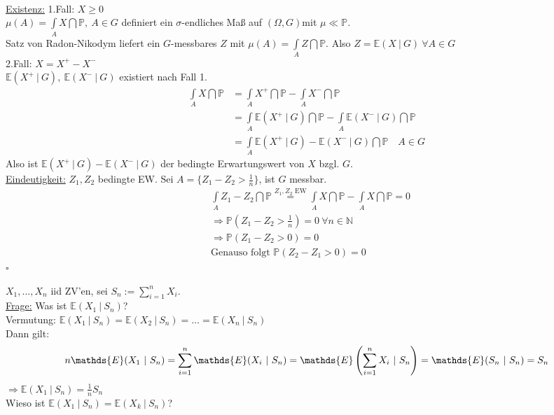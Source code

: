 \\
\uline{Existenz:} 1.Fall: $X\ge 0$\\
$\mu(A)=\int\limits_AX\dint\mathds{P},~A\in G$ definiert ein $\sigma$-endliches Maß auf $(\Omega,G)$mit $\mu \ll \mathds{P}$.\\
Satz von Radon-Nikodym liefert ein $G$-messbares $Z$ mit $\mu(A)=\int\limits_A Z\dint\mathds{P}$. Also $Z=\mathds{E}(X~|~G)~\forall A\in G$\\
2.Fall: $X=X^+-X^-$\\
$\mathds{E}(X^+~|~G),~\mathds{E}(X^-~|~G)$ existiert nach Fall 1.
\begin{equation*}
\begin{aligned}
	\int\limits_AX\dint\mathds{P} &= \int\limits_AX^+\dint\mathds{P}-\int\limits_AX^-\dint\mathds{P}\\
	&= \int\limits_A\mathds{E}(X^+~|~G)\dint\mathds{P}-\int\limits_A\mathds{E}(X^-~|~G)\dint\mathds{P}\\
	&= \int\limits_A\mathds{E}(X^+~|~G)-\mathds{E}(X^-~|~G)\dint\mathds{P}\quad A\in G
\end{aligned}
\end{equation*}
Also ist $\mathds{E}(X^+~|~G)-\mathds{E}(X^-~|~G)$ der bedingte Erwartungswert von $X$ bzgl. $G$.\\
\uline{Eindeutigkeit:} $Z_1,Z_2$ bedingte EW. Sei $A=\{Z_1-Z_2>\frac{1}{n}\}$, ist $G$ messbar.
\begin{equation*}
\begin{aligned}
	&\int\limits_{A}Z_1-Z_2\dint\mathds{P}\stackrel{Z_1,Z_2\text{ EW}}{=} \int\limits_AX\dint\mathds{P}-\int\limits_AX\dint\mathds{P}=0\\
	&\Rightarrow \mathds{P}(Z_1-Z_2>\frac{1}{n})=0~\forall n\in \mathds{N}\\
	&\Rightarrow \mathds{P}(Z_1-Z_2>0)=0\\
	&\text{Genauso folgt } \mathds{P}(Z_2-Z_1>0)=0
\end{aligned}
\end{equation*}
\hfill $\square$

$X_1,\dots,X_n $ iid ZV'en, sei $S_n:=\sum_{i=1}^{n}X_i$.\\
\uline{Frage:} Was ist $\mathds{E}(X_1~|~S_n)$?\\
Vermutung: $\mathds{E}(X_1~|~S_n)=\mathds{E}(X_2~|~S_n)=\dots=\mathds{E}(X_n~|~S_n)$\\
Dann gilt: 
\[
n\mathds{E}(X_1~|~S_n)=\sum_{i=1}^{n}\mathds{E}(X_i~|~S_n)=\mathds{E}\enbrace{\sum_{i=1}^{n}X_i~|~S_n}=\mathds{E}(S_n~|~S_n)=S_n
\]
$\Rightarrow \mathds{E}(X_1~|~S_n)=\frac{1}{n}S_n$\\
Wieso ist $\mathds{E}(X_1~|~S_n)=\mathds{E}(X_k~|~S_n)$?\\

